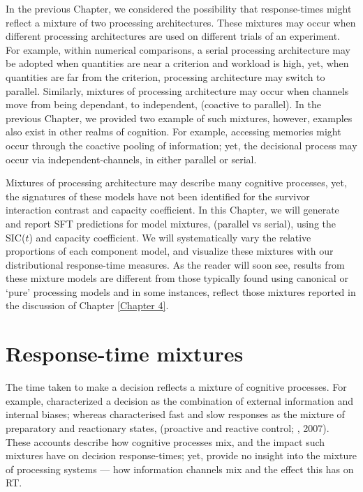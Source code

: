 In the previous Chapter, we considered the possibility that response-times might reflect a mixture of two processing architectures. These mixtures may occur when different processing architectures are used on different trials of an experiment. For example, within numerical comparisons, a serial processing architecture may be adopted when quantities are near a criterion and workload is high, yet, when quantities are far from the criterion, processing architecture may switch to parallel. Similarly, mixtures of processing architecture may occur when channels move from being dependant, to independent, (\eg coactive to parallel). In the previous Chapter, we provided two example of such mixtures, however, examples also exist in other realms of cognition. For example, accessing memories might occur through the coactive pooling of information; yet, the decisional process may occur via independent-channels, in either parallel or serial.

Mixtures of processing architecture may describe many cognitive processes, yet, the signatures of these models have not been identified for the survivor interaction contrast and capacity coefficient. In this Chapter, we will generate and report SFT predictions for model mixtures, (\eg parallel vs serial), using the SIC($t$) and capacity coefficient. We will systematically vary the relative proportions of each component model, and visualize these mixtures with our distributional response-time measures. As the reader will soon see, results from these mixture models are different from those typically found using canonical or `pure' processing models and in some instances, reflect those mixtures reported in the discussion of Chapter \ref{Chapter 4}.

\section{Response-time mixtures}
The time taken to make a decision reflects a mixture of cognitive processes. For example,  characterized a decision as the combination of external information and internal biases; whereas  characterised fast and slow responses as the mixture of preparatory and reactionary states, (\ie proactive and reactive control; \citeauthor{braver2007}, 2007). These accounts describe how cognitive processes mix, and the impact such mixtures have on decision response-times; yet, provide no insight into the mixture of processing systems --- how information channels mix and the effect this has on RT. 

